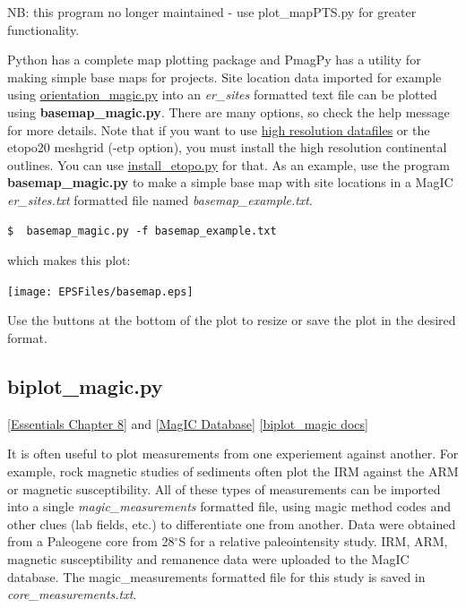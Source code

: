 \documentclass[11pt]{book}
\begin{document}
{{{NB:  this program no longer maintained - use plot\_mapPTS.py for greater functionality.

Python has a complete map plotting package and PmagPy has a utility for making simple base maps for projects.  Site location data imported for example using \href{#orientation_magic.py}{orientation\_magic.py} into an {\it er\_sites} formatted text file can be plotted using {\bf basemap\_magic.py}.  There are many options, so check the help message for more details.   Note that if you want to use  \href{#hires}{high resolution datafiles}
 or the etopo20 meshgrid (-etp option), you must install the high resolution continental outlines.  You can use \href{#install_etopo.py}{install\_etopo.py}  for that.
As an example, use the program {\bf basemap\_magic.py} to make  a simple base map  with site locations in a MagIC {\it er\_sites.txt}  formatted file named {\it basemap\_example.txt}.

\begin{verbatim}
$  basemap_magic.py -f basemap_example.txt
\end{verbatim}

\noindent which makes this plot:

\texttt{[image: EPSFiles/basemap.eps]}

  Use the buttons at the bottom of the plot to resize or save the plot in the desired format.



\subsection{biplot\_magic.py}
\label{ex:biplot_magic}
\href{http://earthref.org/MAGIC/books/Tauxe/Essentials/WebBook3ch8.html#ch8}{
[Essentials Chapter 8]} and \href{#MagICDatabase}{[MagIC Database]}
\href{https://github.com/PmagPy/PmagPy/blob/master/programs/biplot_magic.py}{[biplot\_magic docs]}

It is often useful to plot measurements from one experiement against another.  For example, rock magnetic studies of sediments often plot the IRM against the ARM or magnetic susceptibility.  All of these types of measurements can be imported into a single {\it magic\_measurements} formatted file, using magic method codes and other clues (lab fields, etc.) to differentiate one from another.
Data  were obtained from a Paleogene core from 28$^{\circ}$S for a relative paleointensity study.    IRM, ARM, magnetic susceptibility and remanence data were uploaded to the MagIC database.  The magic\_measurements formatted file for this study is saved in {\it core\_measurements.txt}.

}}}
\end{document}
